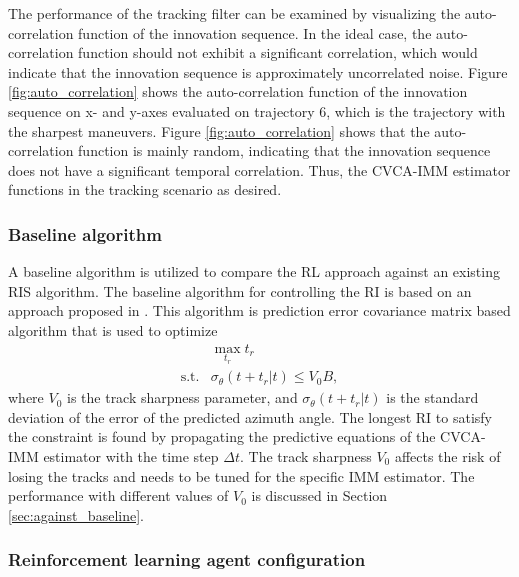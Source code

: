 \documentclass[english, 12pt, a4paper, elec, utf8, a-1b, online]{aaltothesis}
\numberwithin{equation}{section}
\newcommand{\dt}{\Delta t}
\newcommand{\ri}{t_r}
\begin{document}
The performance of the tracking filter can be examined by visualizing the auto-correlation function of the innovation sequence.
In the ideal case, the auto-correlation function should not exhibit a significant correlation, which would indicate that the innovation sequence is approximately uncorrelated noise.
Figure \ref{fig:auto_correlation} shows the auto-correlation function of the innovation sequence on x- and y-axes evaluated on trajectory 6, which is the trajectory with the sharpest maneuvers.
Figure \ref{fig:auto_correlation} shows that the auto-correlation function is mainly random, indicating that the innovation sequence does not have a significant temporal correlation.
Thus, the CVCA-IMM estimator functions in the tracking scenario as desired.



\subsubsection{Baseline algorithm} \label{sec:baseline_algorithm}

A baseline algorithm is utilized to compare the RL approach against an existing RIS algorithm.
The baseline algorithm for controlling the RI is based on an approach proposed in \cite{Daeipour1994}.
This algorithm is prediction error covariance matrix based algorithm that is used to optimize
\begin{equation}\label{eq:baseline_ineq}
    \begin{array}{ll}
         & \max_{t_r} t_r \\
        \text{s.t.} & \sigma_\theta(t+\ri|t) \leq V_0 B, 
    \end{array}
\end{equation}
where $V_0$ is the track sharpness parameter, and $\sigma_\theta(t+\ri|t)$ is the standard deviation of the error of the predicted azimuth angle.
The longest RI to satisfy the constraint is found by propagating the predictive equations of the CVCA-IMM estimator with the time step $\dt$.
The track sharpness $V_0$ affects the risk of losing the tracks and needs to be tuned for the specific IMM estimator.
The performance with different values of $V_0$ is discussed in Section \ref{sec:against_baseline}.

\subsubsection{Reinforcement learning agent configuration}\label{sec:RL_config}
\end{document}
